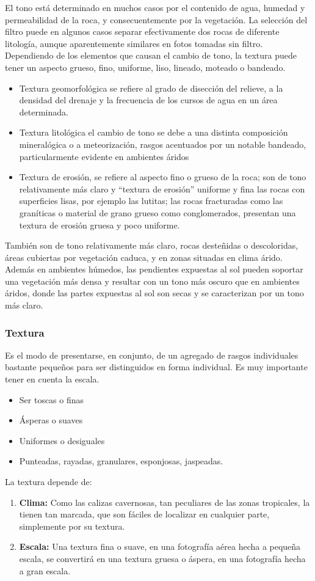 El tono está determinado en muchos casos por el contenido de agua, humedad y permeabilidad de la roca, y consecuentemente por la vegetación. La selección del filtro puede en algunos casos separar efectivamente dos rocas de diferente litología, aunque aparentemente similares en fotos tomadas sin filtro. Dependiendo de los elementos que causan el cambio de tono, la textura puede tener un aspecto grueso, fino, uniforme, liso, lineado, moteado o bandeado.
\begin{itemize}
  \item Textura geomorfológica se refiere al grado de disección del relieve, a la densidad del drenaje y la frecuencia de los cursos de agua en un área determinada.
  \item Textura litológica el cambio de tono se debe a una distinta composición mineralógica o a meteorización, rasgos acentuados por un notable bandeado, particularmente evidente en ambientes áridos
  \item Textura de erosión, se refiere al aspecto fino o grueso de la roca; son de tono relativamente más claro y ``textura de erosión'' uniforme y fina las rocas con superficies lisas, por ejemplo las lutitas; las rocas fracturadas como las graníticas o material de grano grueso como conglomerados, presentan una textura de erosión gruesa y poco uniforme.
\end{itemize}

También son de tono relativamente más claro, rocas desteñidas o descoloridas, áreas cubiertas por vegetación caduca, y en zonas situadas en clima árido. Además en ambientes húmedos, las pendientes expuestas al sol pueden soportar una vegetación más densa y resultar con un tono más oscuro que en ambientes áridos, donde las partes expuestas al sol son secas y se caracterizan por un tono más claro.

\subsubsection{Textura}
Es el modo de presentarse, en conjunto, de un agregado de rasgos individuales bastante pequeños para ser distinguidos en forma individual. Es muy importante tener en cuenta la escala.

\begin{itemize}
  \item Ser toscas o finas
  \item Ásperas o suaves
  \item Uniformes o desiguales
  \item Punteadas, rayadas, granulares, esponjosas, jaspeadas.
\end{itemize}
La textura depende de:
\begin{enumerate}
  \item \textbf{Clima:} Como las calizas cavernosas, tan peculiares de las zonas tropicales, la tienen tan marcada, que son fáciles de localizar en cualquier parte, simplemente por su textura.
  \item \textbf{Escala:} Una textura fina o suave, en una fotografía aérea hecha a pequeña escala, se convertirá en una textura gruesa o áspera, en una fotografía hecha a gran escala.
\end{enumerate}

